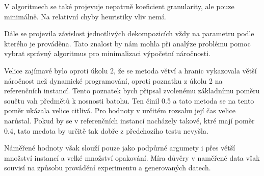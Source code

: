\documentclass[11pt]{article}
\begin{document}
V algoritmech se také projevuje nepatrně koeficient granularity, ale pouze minimálně. Na relativní chyby heuristiky vliv nemá. 

Dále se projevila závislost jednotlivých dekompozicích vždy na parametru podle kterého je prováděna. Tato znalost by nám mohla při analýze problému pomoc vybrat správný algoritmus pro minimalizaci výpočetní náročnosti. 

Velice zajímavé bylo oproti úkolu 2, že se metoda větví a hranic vykazovala větší náročnost než dynamické programování, oproti poznatku z úkolu 2 na referenčních instancí. Tento poznatek bych připsal zvolenému základnímu poměru součtu vah předmětů k nosnosti batohu. Ten činil 0.5 a tato metoda se na tento poměr ukázala velice citlivá. Pro hodnoty v určitém rozsahu její čas velice narůstal. Pokud by se v referenčních instancí nacházely takové, ktré mají poměr 0.4, tato medota by určitě tak dobře z předchozího testu nevyšla.

Náměřené hodnoty však slouží pouze jako podpůrné argumety i přes větší množství instancí a velké množství opakování. Míra důvěry v naměřené data však souvisí na způsobu provádění experimentu a generovaných datech. 
\end{document}
